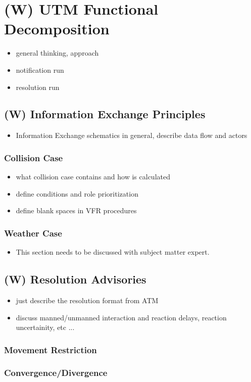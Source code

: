 \section{(W) UTM Functional Decomposition}\label{sec:UTMFunctionaalDecomposition}
\begin{itemize}
    \item general thinking, approach 
    \item notification run
    \item resolution run
\end{itemize}

\subsection{(W) Information Exchange Principles}\label{sec:InformationExchangePrinciples}
\begin{itemize}
    \item Information Exchange schematics in general, describe data flow and actors
\end{itemize}

\subsubsection{ Collision Case}\label{sec:CollisionCase}
\begin{itemize}
    \item what collision case contains and how is calculated
    \item define conditions and role prioritization
    \item define blank spaces in VFR procedures 
\end{itemize}

\subsubsection{Weather Case}\label{sec:WeatherCase}
\begin{itemize}
    \item This section needs to be discussed with subject matter expert.
\end{itemize}

\subsection{(W) Resolution Advisories}\label{sec:ResolutionAdvisiories}
\begin{itemize}
    \item just describe the resolution format from ATM
    \item discuss manned/unmanned interaction and reaction delays, reaction uncertainity, etc ...
\end{itemize}
\subsubsection{Movement Restriction}\label{sec:MovementRestriction}
\subsubsection{Convergence/Divergence}\label{sec:ConvergenceDivergence}

